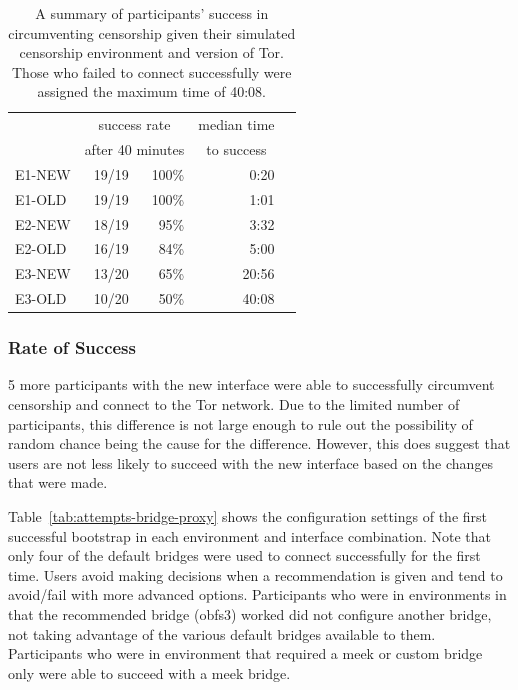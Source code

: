\documentclass[USenglish,oneside,twocolumn]{article}
\begin{document}
\begin{table}
\centering
	\begin{tabular}{l r r r r}
	& \multicolumn{2}{c}{success rate} & \multicolumn{1}{c}{median time} \\
	& \multicolumn{2}{c}{after 40 minutes} & \multicolumn{1}{c}{to success} \\
	\noalign{\hrule}
	E1-NEW & 19/19 & 100\% & 0:20 \\ %
	E1-OLD & 19/19 & 100\% & 1:01 \\ %
	E2-NEW & 18/19 & 95\% & 3:32 \\ %
	E2-OLD & 16/19 & 84\% & 5:00 \\ %
	E3-NEW & 13/20 & 65\% & 20:56 \\ %
	E3-OLD & 10/20 & 50\% & 40:08 \\ %
	\end{tabular}
\caption{
A summary of participants' success in circumventing censorship
given their simulated censorship environment and version of Tor. Those who
failed to connect successfully were assigned the maximum time of 40:08.
}
\label{table:participant-summary}
\end{table}

\subsubsection{Rate of Success} 
5 more participants with the new interface were able to successfully circumvent censorship and connect to the Tor network. Due to the limited number of participants, this difference is not large enough to rule out the possibility of random chance being the cause for the difference. However, this does suggest that users are not less likely to succeed with the new interface based on the changes that were made. 

Table~\ref{tab:attempts-bridge-proxy} shows the configuration settings of the first successful bootstrap in each environment and interface combination. Note that only four of the default bridges were used to connect successfully for the first time. Users avoid making decisions when a recommendation is given and tend to avoid/fail with more advanced options. Participants who were in environments in that the recommended bridge (obfs3) worked did not configure another bridge, not taking advantage of the various default bridges available to them. Participants who were in environment that required a meek or custom bridge only were able to succeed with a meek bridge.
\end{document}
